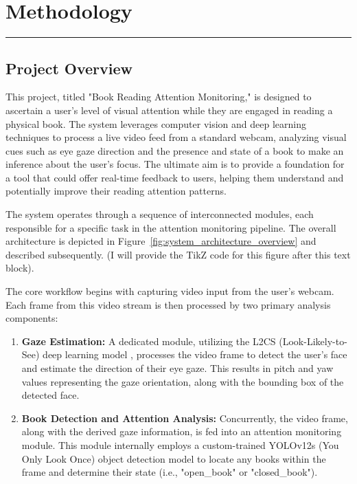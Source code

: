 \chapter{Methodology}
\vspace{-1.5cm}
\hspace{-1cm}\rule{19cm}{0.4pt} 

\section{Project Overview}
This project, titled "Book Reading Attention Monitoring," is designed to ascertain a user's level of visual attention while they are engaged in reading a physical book. The system leverages computer vision and deep learning techniques to process a live video feed from a standard webcam, analyzing visual cues such as eye gaze direction and the presence and state of a book to make an inference about the user's focus. The ultimate aim is to provide a foundation for a tool that could offer real-time feedback to users, helping them understand and potentially improve their reading attention patterns.

The system operates through a sequence of interconnected modules, each responsible for a specific task in the attention monitoring pipeline. The overall architecture is depicted in Figure~\ref{fig:system_architecture_overview} and described subsequently. (I will provide the TikZ code for this figure after this text block).

The core workflow begins with capturing video input from the user's webcam. Each frame from this video stream is then processed by two primary analysis components:
\begin{enumerate}
    \item \textbf{Gaze Estimation:} A dedicated module, utilizing the L2CS (Look-Likely-to-See) deep learning model \cite{L2CSNet2022}, processes the video frame to detect the user's face and estimate the direction of their eye gaze. This results in pitch and yaw values representing the gaze orientation, along with the bounding box of the detected face.
    \item \textbf{Book Detection and Attention Analysis:} Concurrently, the video frame, along with the derived gaze information, is fed into an attention monitoring module. This module internally employs a custom-trained YOLOv12s (You Only Look Once) object detection model \cite{Redmon_YOLO_2016} to locate any books within the frame and determine their state (i.e., "open\_book" or "closed\_book").
\end{enumerate}

